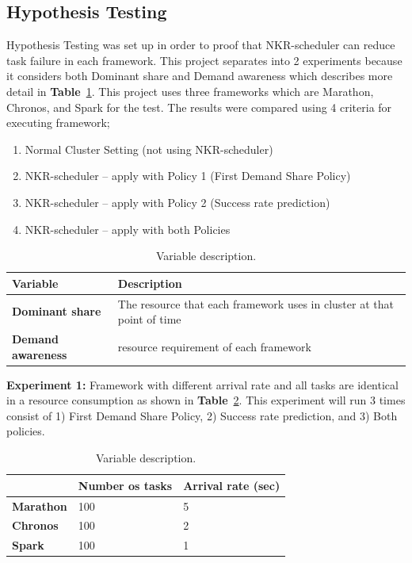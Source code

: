 \documentclass[12pt,oneside,openright,a4paper]{cpe-english-project}
\begin{document}
\subsection{Hypothesis Testing} 
\hspace{10mm}Hypothesis Testing was set up in order to proof that NKR-scheduler can reduce task failure in each framework. This project separates into 2 experiments because it considers both Dominant share and Demand awareness which describes more detail in \textbf{Table}~\ref{tbl:VariableDescription}. This project uses three frameworks which are Marathon, Chronos, and Spark for the test.  The results were compared using 4 criteria for executing framework;
\begin{enumerate}
  \item Normal Cluster Setting (not using NKR-scheduler) 
  \item NKR-scheduler – apply with Policy 1 (First Demand Share Policy)
  \item NKR-scheduler – apply with Policy 2 (Success rate prediction)
  \item NKR-scheduler – apply with both Policies 
\end{enumerate}

\begin{table}[!h]
  \caption{Variable description.}\label{tbl:VariableDescription}
  \begin{tabular}{@{}|p{}|p{}|}
    \hline
    \textbf{Variable} & \textbf{Description}\\
    \hline
    \textbf{Dominant share} & The resource that each framework uses in cluster at that point of time\\
    \hline
    \textbf{Demand awareness} & resource requirement of each framework \\
    \hline
  \end{tabular}
\end{table}

\textbf{Experiment 1:} Framework with different arrival rate and all tasks are identical in a resource consumption as shown in \textbf{Table}~\ref{tbl:Experiment1}. This experiment will run 3 times consist of 1) First Demand Share Policy, 2) Success rate prediction, and 3) Both policies.

\begin{table}[!h]
  \caption{Variable description.}\label{tbl:Experiment1}
  \begin{tabular}{@{}|p{}|p{}|p{}|}
    \hline
    & \textbf{Number os tasks} & \textbf{Arrival rate (sec)}\\
    \hline
    \textbf{Marathon} & 100 & 5\\
    \hline
    \textbf{Chronos} & 100 & 2 \\
    \hline
    \textbf{Spark} & 100 & 1 \\
    \hline
\end{tabular}
\end{table}
\end{document}
